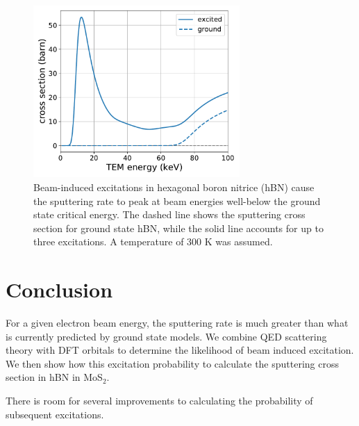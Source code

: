 \documentclass{article}
\begin{document}
\begin{figure}
    \centering
    \includegraphics[width=0.7\textwidth]{images/totCrosshBN.pdf}
    \caption{
    Beam-induced excitations in hexagonal boron nitrice (hBN) cause the sputtering rate to peak at beam energies well-below the ground state critical energy.  The dashed line shows the sputtering cross section for ground state hBN, while the solid line accounts for up to three excitations.  A temperature of 300 K was assumed.
    }
    \label{fig:totCrosshBN.pdf}
\end{figure}

\section{Conclusion}

For a given electron beam energy, the sputtering rate is much greater than what is currently predicted by ground state models.
We combine QED scattering theory with DFT orbitals to determine the likelihood of beam induced excitation.  We then show how this excitation probability to calculate the sputtering cross section in hBN in MoS$_2$.

There is room for several improvements to calculating the probability of subsequent excitations.
\end{document}
